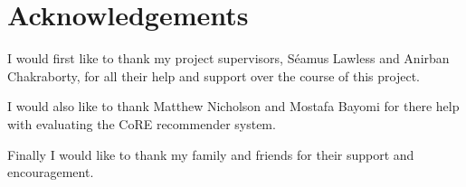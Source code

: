 \chapter*{\Huge{Acknowledgements}}

I would first like to thank my project supervisors, Séamus Lawless and Anirban Chakraborty, for all their help and support over the course of this project. 

I would also like to thank Matthew Nicholson and Mostafa Bayomi for there help with evaluating the CoRE recommender system.

Finally I would like to thank my family and friends for their support and encouragement.